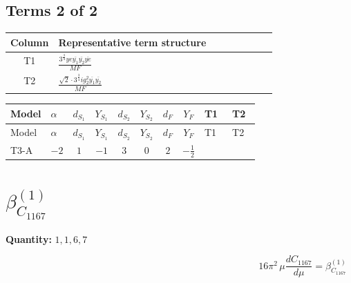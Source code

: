 \documentclass[8pt]{article}
\begin{document}
\begin{landscape}
\subsection*{Terms 2 of 2}
\begin{center}
\begin{tabular}{@{}c >{\raggedright\arraybackslash}p{0.82\linewidth}@{}}
\toprule
Column & Representative term structure \\
\midrule
T1 & \(\displaystyle \frac{3^{\frac{3}{4}} ye \overline{y_{1}} \overline{y_{2}} \overline{ye}}{MF}\) \\
\midrule
T2 & \(\displaystyle \frac{\sqrt{2} \cdot 3^{\frac{3}{4}} i g_{2}^{2} \overline{y_{1}} \overline{y_{2}}}{MF}\) \\
\midrule
\bottomrule
\end{tabular}
\end{center}
\smallskip
\tiny
\begin{longtable}{@{}llcccccc >{\raggedright\arraybackslash}p{0.21\linewidth} >{\raggedright\arraybackslash}p{0.21\linewidth}@{}}
\toprule
Model & $\alpha$ & $d_{S_1}$ & $Y_{S_1}$ & $d_{S_2}$ & $Y_{S_2}$ & $d_F$ & $Y_F$ & T1 & T2 \\
\midrule
\endfirsthead
\toprule
Model & $\alpha$ & $d_{S_1}$ & $Y_{S_1}$ & $d_{S_2}$ & $Y_{S_2}$ & $d_F$ & $Y_F$ & T1 & T2 \\
\midrule
\endhead
T3-A & $-2$ & $1$ & $-1$ & $3$ & $0$ & $2$ & $-\frac{1}{2}$ & \scriptsize\adjustbox{max width=\linewidth}{$\begin{gathered} - \frac{3^{\frac{3}{4}} ye \overline{y_{1}} \overline{y_{2}} \overline{ye}}{12 MF}\end{gathered}$} & \scriptsize\adjustbox{max width=\linewidth}{$\begin{gathered} \frac{\sqrt{2} \cdot 3^{\frac{3}{4}} i g_{2}^{2} \overline{y_{1}} \overline{y_{2}}}{3 MF}\end{gathered}$} \\
\midrule
\bottomrule
\end{longtable}
\clearpage
\section*{$\beta_{C_{1167}}^{(1)}$}
\noindent\textbf{Quantity: }$\mathrm{1,1,6,7}$\par\smallskip
\[16\pi^2\,\mu\frac{d C_{1167}}{d\mu}=\beta_{C_{1167}}^{(1)}\]

\end{landscape}
\end{document}
